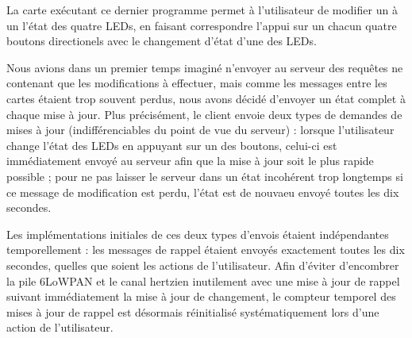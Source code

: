 La carte exécutant ce dernier programme permet à l’utilisateur de modifier un à un l’état des quatre LEDs, en faisant correspondre l’appui sur un chacun quatre boutons directionels avec le changement d’état d’une des LEDs.

Nous avions dans un premier temps imaginé n’envoyer au serveur des requêtes ne contenant que les modifications à effectuer, mais comme les messages entre les cartes étaient trop souvent perdus, nous avons décidé d’envoyer un état complet à chaque mise à jour.
Plus précisément, le client envoie deux types de demandes de mises à jour (indifférenciables du point de vue du serveur) : lorsque l’utilisateur change l’état des LEDs en appuyant sur un des boutons, celui-ci est immédiatement envoyé au serveur afin que la mise à jour soit le plus rapide possible ; pour ne pas laisser le serveur dans un état incohérent trop longtemps si ce message de modification est perdu, l’état est de nouvaeu envoyé toutes les dix secondes.

Les implémentations initiales de ces deux types d’envois étaient indépendantes temporellement : les messages de rappel étaient envoyés exactement toutes les dix secondes, quelles que soient les actions de l’utilisateur.
Afin d’éviter d’encombrer la pile 6LoWPAN et le canal hertzien inutilement avec une mise à jour de rappel suivant immédiatement la mise à jour de changement, le compteur temporel des mises à jour de rappel est désormais réinitialisé systématiquement lors d’une action de l’utilisateur.
